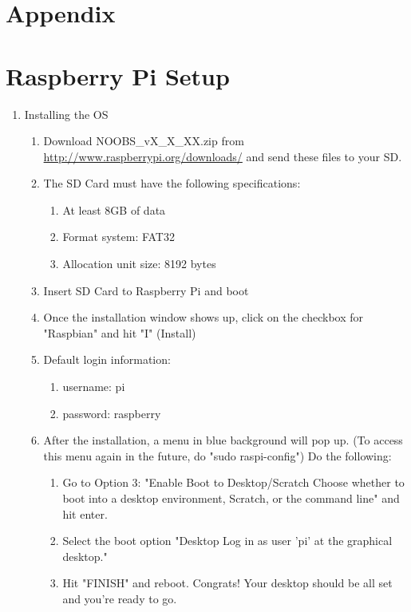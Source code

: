 \section{Appendix}
\appendix
\section{Raspberry Pi Setup}
\begin{enumerate}
\item Installing the OS
        \begin{enumerate}[label*=\arabic*.]
            \item Download NOOBS\_vX\_X\_XX.zip from \url{http://www.raspberrypi.org/downloads/}    and send these files to your SD.
            \item The SD Card must have the following specifications:
                \begin{enumerate}[label*=\arabic*.]
                    \item At least 8GB of data
                    \item Format system: FAT32
                    \item Allocation unit size: 8192 bytes
                \end{enumerate}
            \item Insert SD Card to Raspberry Pi and boot
            \item Once the installation window shows up, click on the checkbox for "Raspbian" and hit "I" (Install)
            \item Default login information:
                \begin{enumerate}[label*=\arabic*.]
                    \item username: pi
                    \item password: raspberry
                \end{enumerate}
            \item After the installation, a menu in blue background will pop up. (To access this menu again in the future, do "sudo raspi-config") Do the following:
                \begin{enumerate}[label*=\arabic*.]
                    \item Go to Option 3: "Enable Boot to Desktop/Scratch Choose whether to boot into a desktop environment, Scratch, or the command line" and hit enter.
                    \item Select the boot option "Desktop Log in as user 'pi' at the graphical desktop."
                    \item Hit "FINISH" and reboot. Congrats! Your desktop should be all set and you're ready to go.
                \end{enumerate}
        \end{enumerate}


\end{enumerate}
